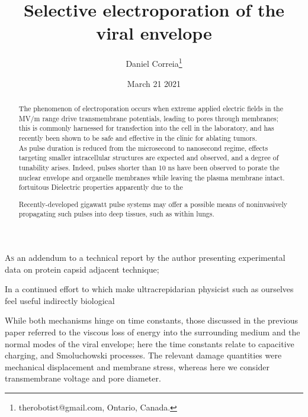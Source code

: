 \documentclass[fleqn,10pt]{paper}
\begin{document}
\title{Selective electroporation of the viral envelope}
\author{\footnotesize{Daniel Correia}\footnote{therobotist@gmail.com, Ontario, Canada.}}
\date{\small{March 21 2021}}

\flushbottom 
\maketitle



\thispagestyle{empty}

\renewcommand{\abstractname}{Summary}    %

\begin{abstract}
	\noindent The phenomenon of electroporation occurs when extreme applied electric fields in the MV/m range drive transmembrane potentials, leading to pores through membranes; this is commonly harnessed for transfection into the cell in the laboratory, and has recently been shown to be safe and effective in the clinic for ablating tumors.\\
	
	\noindent As pulse duration is reduced from the microsecond to nanosecond regime, effects targeting smaller intracellular structures are expected and observed, and a degree of tunability arises. Indeed, pulses shorter than 10 ns have been observed to porate the nuclear envelope and organelle membranes while leaving the plasma membrane intact. \\
	
	fortuitous Dielectric properties apparently due to the 
	
	\noindent Recently-developed gigawatt pulse systems may offer a possible means of noninvasively propagating such pulses into deep tissues, such as within lungs. 
\end{abstract}

\lettrine{A}{s} an addendum to a technical report \cite{notes2021} by the author presenting experimental data on protein capsid adjacent technique; 

In a continued effort to which make ultracrepidarian physicist such as ourselves feel useful indirectly biological 

While both mechanisms hinge on time constants, those discussed in the previous paper referred to the viscous loss of energy into the surrounding medium and the normal modes of the viral envelope; here the time constants relate to capacitive charging, and Smoluchowski processes. The relevant damage quantities were mechanical displacement and membrane stress, whereas here we consider transmembrane voltage and pore diameter. 
\end{document}
